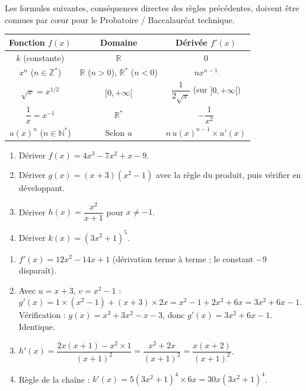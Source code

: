 \documentclass[11pt]{article}
\begin{document}
\begin{aretenir}
Les formules suivantes, conséquences directes des règles précédentes, doivent être connues par cœur pour le Probatoire / Baccalauréat technique.
\begin{center}
\begin{tabular}{|c|c|c|}
\hline
\rowcolor{popblueL} \textbf{Fonction $f(x)$} & \textbf{Domaine} & \textbf{Dérivée $f'(x)$} \\
\hline
$k$ (constante) & $\mathbb{R}$ & $0$ \\
\hline
$x^n$ ($n \in \mathbb{Z}^*$) & $\mathbb{R}$ ($n>0$), $\mathbb{R}^*$ ($n<0$) & $n x^{n-1}$ \\
\hline
$\sqrt{x} = x^{1/2}$ & $[0, +\infty[$ & $\dfrac{1}{2\sqrt{x}}$ (sur $]0,+\infty[$) \\
\hline
$\dfrac{1}{x} = x^{-1}$ & $\mathbb{R}^*$ & $-\dfrac{1}{x^2}$ \\
\hline
$u(x)^n$ ($n \in \mathbb{N}^*$) & Selon $u$ & $n\,u(x)^{n-1} \times u'(x)$ \\
\hline
\end{tabular}
\end{center}
\end{aretenir}

\begin{exercice}
\begin{enumerate}
\item Dériver $f(x) = 4x^3 - 7x^2 + x - 9$.
\item Dériver $g(x) = (x + 3)(x^2 - 1)$ avec la règle du produit, puis vérifier en développant.
\item Dériver $h(x) = \dfrac{x^2}{x + 1}$ pour $x \neq -1$.
\item Dériver $k(x) = (3x^2 + 1)^5$.
\end{enumerate}
\end{exercice}

\begin{corrige}
\begin{enumerate}
\item $f'(x) = 12x^2 - 14x + 1$ (dérivation terme à terme ; le constant $-9$ disparaît).
\item Avec $u = x+3$, $v = x^2 - 1$ : $g'(x) = 1 \times (x^2 - 1) + (x+3) \times 2x = x^2 - 1 + 2x^2 + 6x = 3x^2 + 6x - 1$. Vérification : $g(x) = x^3 + 3x^2 - x - 3$, donc $g'(x) = 3x^2 + 6x - 1$. Identique.
\item $h'(x) = \dfrac{2x(x+1) - x^2 \times 1}{(x+1)^2} = \dfrac{x^2 + 2x}{(x+1)^2} = \dfrac{x(x+2)}{(x+1)^2}$.
\item Règle de la chaîne : $k'(x) = 5(3x^2+1)^4 \times 6x = 30x(3x^2+1)^4$.
\end{enumerate}
\end{corrige}
\end{document}
